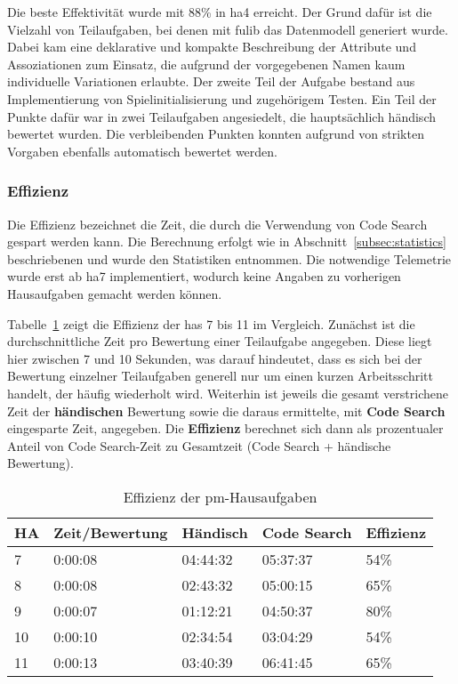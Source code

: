 Die beste Effektivität wurde mit 88\% in \ac{ha}4 erreicht.
Der Grund dafür ist die Vielzahl von Teilaufgaben, bei denen mit fulib das Datenmodell generiert wurde.
Dabei kam eine deklarative und kompakte Beschreibung der Attribute und Assoziationen zum Einsatz, die aufgrund der vorgegebenen Namen kaum individuelle Variationen erlaubte.
Der zweite Teil der Aufgabe bestand aus Implementierung von Spielinitialisierung und zugehörigem Testen.
Ein Teil der Punkte dafür war in zwei Teilaufgaben angesiedelt, die hauptsächlich händisch bewertet wurden.
Die verbleibenden Punkten konnten aufgrund von strikten Vorgaben ebenfalls automatisch bewertet werden.

\subsubsection{Effizienz}

Die Effizienz bezeichnet die Zeit, die durch die Verwendung von Code Search gespart werden kann.
Die Berechnung erfolgt wie in Abschnitt~\ref{subsec:statistics} beschriebenen und wurde den Statistiken entnommen.
Die notwendige Telemetrie wurde erst ab \ac{ha}7 implementiert, wodurch keine Angaben zu vorherigen Hausaufgaben gemacht werden können.

Tabelle~\ref{tbl:pm-efficiency} zeigt die Effizienz der \acp{ha} 7 bis 11 im Vergleich.
Zunächst ist die durchschnittliche Zeit pro Bewertung einer Teilaufgabe angegeben.
Diese liegt hier zwischen 7 und 10 Sekunden, was darauf hindeutet, dass es sich bei der Bewertung einzelner Teilaufgaben generell nur um einen kurzen Arbeitsschritt handelt, der häufig wiederholt wird.
Weiterhin ist jeweils die gesamt verstrichene Zeit der \textbf{händischen} Bewertung sowie die daraus ermittelte, mit \textbf{Code Search} eingesparte Zeit, angegeben.
Die \textbf{Effizienz} berechnet sich dann als prozentualer Anteil von Code Search-Zeit zu Gesamtzeit (Code Search + händische Bewertung).


\begin{table}
    \centering
    \caption{Effizienz der \ac{pm}-Hausaufgaben}
    \begin{tabular}{|l|l|l|l|l|}
    \hline
        HA  & Zeit/Bewertung & Händisch & Code Search & Effizienz \\ \hline
        7   & 0:00:08 & 04:44:32 & 05:37:37 & 54\% \\ \hline
        8   & 0:00:08 & 02:43:32 & 05:00:15 & 65\% \\ \hline
        9   & 0:00:07 & 01:12:21 & 04:50:37 & 80\% \\ \hline
        10  & 0:00:10 & 02:34:54 & 03:04:29 & 54\% \\ \hline
        11  & 0:00:13 & 03:40:39 & 06:41:45	& 65\% \\ \hline
    \end{tabular}
    \label{tbl:pm-efficiency}
\end{table}

